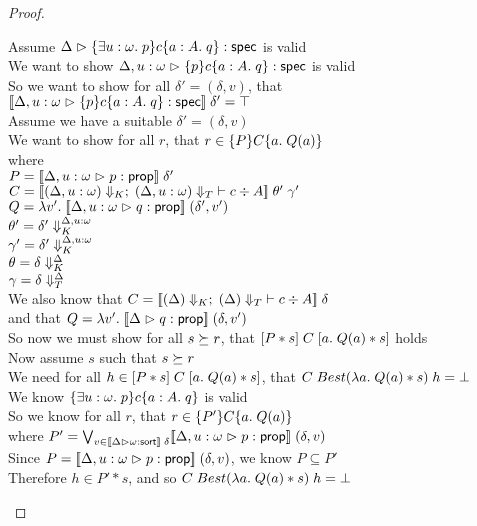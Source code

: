 \begin{proof}
  \begin{tabbedproof}
    \oo Assume $\judgeS{\spec{\exists u:\omega.\;p}{c}{a:A}{q}}$ is valid \\
    \ooo We want to show $\judgeS[\Delta, u:\omega]{\spec{p}{c}{a:A}{q}}$ is valid \\
    \ooo So we want to show for all $\delta' = (\delta, v)$, that $\interp{\judgeS[\Delta, u:\omega]{\spec{p}{c}{a:A}{q}}}\;\delta' = \top$ \\
    \ooo Assume we have a suitable $\delta' = (\delta, v)$ \\ 
    \oooo We want to show for all $r$, that $r \in \spec{P}{C}{a}{Q(a)}$ \\
    \oooo where \\
    \oooox $P = \interp{\judgeA[\Delta, u:\omega]{p}{\assert}}\;\delta'$ \\
    \oooox $C = \interp{\judgeC[\restrictkind{\Delta, u:\omega}]{\restricttype{\Delta, u:\omega}}{c}{A}}\;\theta'\;\gamma'$ \\
    \oooox $Q = \semfun{v'}{\interp{\judgeA[\Delta, u:\omega]{q}{\assert}}\;(\delta',v')}$\\
    \oooox $\theta' = \restricttyenv{\Delta, u:\omega}{\delta'}$ \\
    \oooox $\gamma' = \restricttyenv{\Delta, u:\omega}{\delta'}$ \\
    \oooox $\theta = \restricttyenv{\Delta}{\delta}$ \\
    \oooox $\gamma = \restrictvals{\Delta}{\delta}$ \\
    \oooo We also know that $C = \interp{\judgeC[\restrictkind{\Delta}]{\restricttype{\Delta}}{c}{A}}\;\delta$ \\
    \oooo and that $Q = \semfun{v'}{\interp{\judgeA{q}{\assert}}\;(\delta,v')}$\\
    \oooo So now we must show for all $s \worldgeq r$, that $\basicspec{P * s}{C}{a}{Q(a) * s}$ holds\\
    \oooo Now assume $s$ such that $s \worldgeq r$ \\
    \ooooo We need for all $h \in \basicspec{P * s}{C}{a}{Q(a) * s}$, that 
             $C\;Best(\semfun{a}{Q(a) * s})\;h = \bot$ \\
    \ooooo We know $\spec{\exists u:\omega.\;p}{c}{a:A}{q}$ is valid \\
    \ooooo So we know for all $r$, that $r \in \spec{P'}{C}{a}{Q(a)}$ \\
    \oooox where $P' = \bigvee_{v \in \interp{\judgeSort{\omega}}\;\delta} \interp{\judgeA[\Delta, u:\omega]{p}{\assert}}\;(\delta, v)$ \\
    \ooooo Since $P = \interp{\judgeA[\Delta,u:\omega]{p}{\assert}}\;(\delta, v)$, we know $P \subseteq P'$ \\
    \ooooo Therefore $h \in P' * s$, and so $C\;Best(\semfun{a}{Q(a) * s})\;h = \bot$ \\
    
  \end{tabbedproof}
\end{proof}

